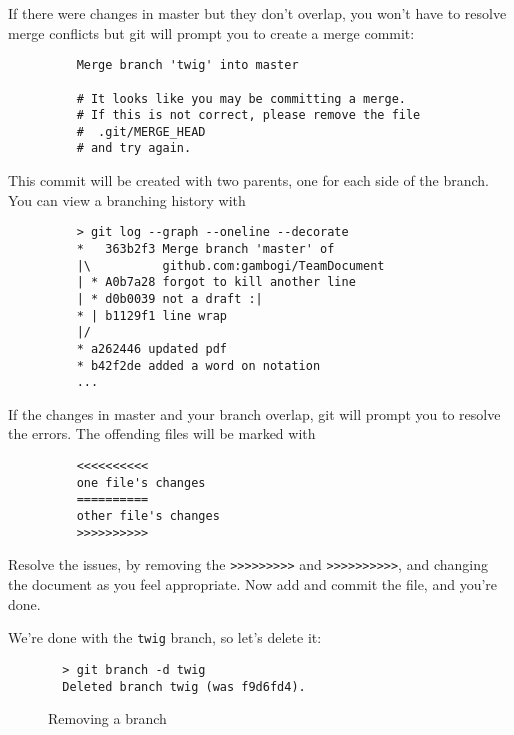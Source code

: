 \documentclass[11pt]{report}
\begin{document}
If there were changes in master but they don't overlap, you won't have
to resolve merge conflicts but git will prompt you to create a merge
commit:

\begin{figure}[H]
  \begin{lstlisting}
    Merge branch 'twig' into master
    
    # It looks like you may be committing a merge.
    # If this is not correct, please remove the file
    #  .git/MERGE_HEAD
    # and try again.
  \end{lstlisting}
\end{figure}

This commit will be created with two parents, one for each side of the
branch. You can view a branching history with

\begin{figure}[H]
  \begin{lstlisting}
    > git log --graph --oneline --decorate
    *   363b2f3 Merge branch 'master' of
    |\          github.com:gambogi/TeamDocument
    | * A0b7a28 forgot to kill another line
    | * d0b0039 not a draft :|
    * | b1129f1 line wrap
    |/  
    * a262446 updated pdf
    * b42f2de added a word on notation
    ...
  \end{lstlisting}
\end{figure}

If the changes in master and your branch overlap, git will prompt you
to resolve the errors. The offending files will be marked with

\begin{figure}[H]
  \begin{lstlisting}
    <<<<<<<<<<
    one file's changes
    ==========
    other file's changes
    >>>>>>>>>>
  \end{lstlisting}
\end{figure}

Resolve the issues, by removing the \texttt{>>>>>>>>>}
and \texttt{>>>>>>>>>>}, and changing the document as you feel appropriate.
Now add and commit the file, and you're done.

We're done with the \texttt{twig} branch, so let's delete it:
\begin{figure}[H]
  \caption{Removing a branch}
  \begin{lstlisting}
  > git branch -d twig
  Deleted branch twig (was f9d6fd4).
  \end{lstlisting}
\end{figure}
\end{document}
